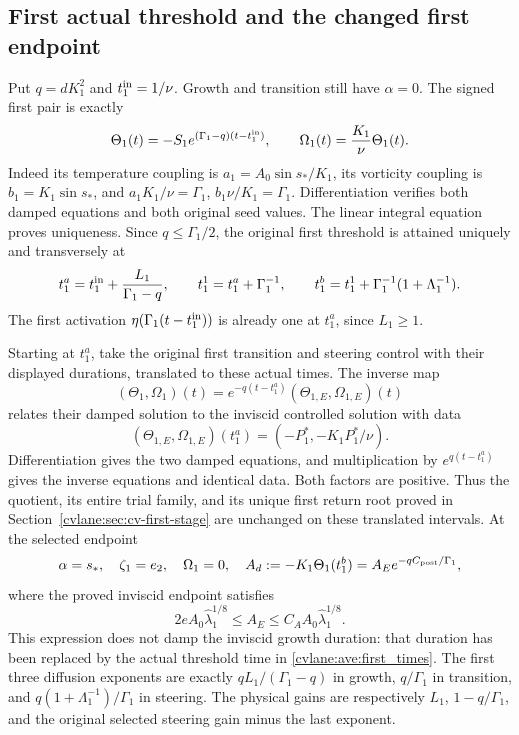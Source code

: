 \subsection{First actual threshold and the changed first endpoint}

Put $q=dK_1^2$ and $t_1^{\rm in}=1/\nu$.
Growth and transition still have $\alpha=0$. The signed first pair is
exactly
\begin{equation}\label{cvlane:ave:first_growth}
 \Theta_1(t)=-S_1e^{(\Gamma_1-q)(t-t_1^{\rm in})},\qquad
 \Omega_1(t)=\frac{K_1}{\nu}\Theta_1(t).
\end{equation}
Indeed its temperature coupling is $a_1=A_0\sin s_*/K_1$,
its vorticity coupling is $b_1=K_1\sin s_*$, and
$a_1K_1/\nu=\Gamma_1$, $b_1\nu/K_1=\Gamma_1$.
Differentiation verifies both damped equations and both original
seed values. The linear integral equation proves uniqueness.
Since $q\leq\Gamma_1/2$, the original first threshold is attained
uniquely and transversely at
\begin{equation}\label{cvlane:ave:first_times}
 t_1^a=t_1^{\rm in}+\frac{L_1}{\Gamma_1-q},\qquad
 t_1^1=t_1^a+\Gamma_1^{-1},\qquad
 t_1^b=t_1^1+\Gamma_1^{-1}(1+\Lambda_1^{-1}).
\end{equation}
The first activation $\eta(\Gamma_1(t-t_1^{\rm in}))$ is already one
at $t_1^a$, since $L_1\geq1$.

Starting at $t_1^a$, take the original first transition and steering
control with their displayed durations, translated to these actual
times. The inverse map
\[
 (\Theta_1,\Omega_1)(t)
   =e^{-q(t-t_1^a)}(\Theta_{1,E},\Omega_{1,E})(t)
\]
relates their damped solution to the inviscid controlled solution
with data
\[
 (\Theta_{1,E},\Omega_{1,E})(t_1^a)
       =(-P_1^*,-K_1P_1^*/\nu).
\]
Differentiation gives the two damped equations, and multiplication
by $e^{q(t-t_1^a)}$ gives the inverse equations and identical data.
Both factors are positive. Thus the quotient, its entire trial
family, and its unique first return root proved in
Section~\ref{cvlane:sec:cv-first-stage} are unchanged on these translated
intervals. At the selected endpoint
\begin{equation}\label{cvlane:ave:first_endpoint}
 \alpha=s_*,\quad\zeta_1=e_2,\quad\Omega_1=0,\quad
 A_d:=-K_1\Theta_1(t_1^b)
       =A_Ee^{-qC_{\rm post}/\Gamma_1},
\end{equation}
where the proved inviscid endpoint satisfies
\begin{equation}\label{cvlane:ave:AE_bounds}
 2eA_0\widehat\lambda_1^{1/8}\leq A_E
          \leq C_A A_0\widehat\lambda_1^{1/8}.
\end{equation}
This expression does not damp the inviscid growth duration: that
duration has been replaced by the actual threshold time in
\eqref{cvlane:ave:first_times}. The first three diffusion exponents are
exactly $qL_1/(\Gamma_1-q)$ in growth, $q/\Gamma_1$ in transition,
and $q(1+\Lambda_1^{-1})/\Gamma_1$ in steering. The physical gains
are respectively $L_1$, $1-q/\Gamma_1$, and the original selected
steering gain minus the last exponent.

